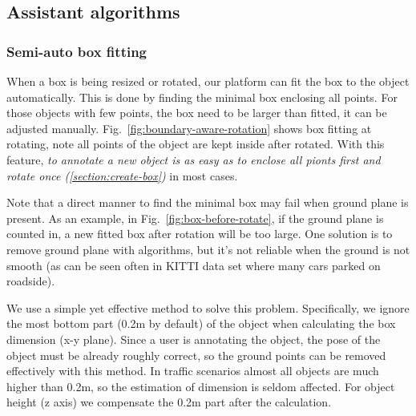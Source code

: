 \documentclass[letterpaper, 10 pt, conference]{ieeeconf}  %
\begin{document}
\subsection{Assistant algorithms}


\subsubsection{Semi-auto box fitting}
\label{section:auto-fitting}
When a box is being resized or rotated, our platform can fit the box to the object automatically. This is done by finding the minimal box enclosing all points. For those objects with few points, the box need to be larger than fitted, it can be adjusted manually. Fig.~\ref{fig:boundary-aware-rotation} shows box fitting at rotating, note all points of the object are kept inside after rotated. With this feature, \emph{to annotate a new object is as easy as to enclose all pionts first and rotate once (\ref{section:create-box})} in most cases.

Note that a direct manner to find the minimal box may fail when ground plane is present. As an example, in Fig.~\ref{fig:box-before-rotate}, if the ground plane is counted in, a new fitted box after rotation will be too large. One solution is to remove ground plane with algorithms, but it's not reliable when the ground is not smooth (as can be seen often in KITTI data set\cite{Geiger2012CVPR} where many cars parked on roadside).

We use a simple yet effective method to solve this problem. Specifically, we  ignore the most bottom part (0.2m by default) of the object when calculating the box dimension (x-y plane). Since a user is annotating the object, the pose of the object must be already roughly correct, so the  ground points can be removed effectively with this method. In traffic scenarios almost all objects are much higher than 0.2m, so the estimation of dimension is  seldom affected. For object height (z axis) we compensate the 0.2m part after the calculation. 
\end{document}
